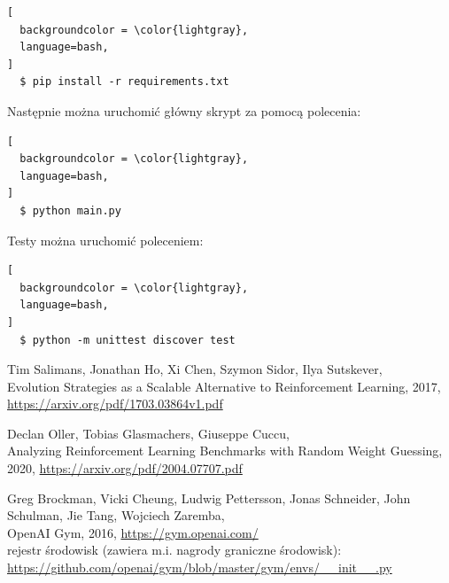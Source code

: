 \documentclass[12pt,a4paper]{article}
\begin{document}
\begin{lstlisting}[
  backgroundcolor = \color{lightgray},
  language=bash,
]
  $ pip install -r requirements.txt
\end{lstlisting}

\bigskip

Następnie można uruchomić główny skrypt za pomocą polecenia:

\begin{lstlisting}[
  backgroundcolor = \color{lightgray},
  language=bash,
]
  $ python main.py
\end{lstlisting}

Testy można uruchomić poleceniem:

\begin{lstlisting}[
  backgroundcolor = \color{lightgray},
  language=bash,
]
  $ python -m unittest discover test
\end{lstlisting}


\pagebreak
\begin{thebibliography}{9}
  Tim Salimans, Jonathan Ho, Xi Chen, Szymon Sidor, Ilya Sutskever,\\
  Evolution Strategies as a Scalable Alternative to Reinforcement Learning,
  2017, \href{https://arxiv.org/pdf/1703.03864v1.pdf}{https://arxiv.org/pdf/1703.03864v1.pdf}

  Declan Oller, Tobias Glasmachers, Giuseppe Cuccu, \\
  Analyzing Reinforcement Learning Benchmarks with Random Weight Guessing,
  2020, \href{https://arxiv.org/pdf/2004.07707.pdf}{https://arxiv.org/pdf/2004.07707.pdf}

  Greg Brockman, Vicki Cheung, Ludwig Pettersson, Jonas Schneider, John Schulman, Jie Tang, Wojciech Zaremba,\\
  OpenAI Gym, 2016, \href{https://gym.openai.com/}{https://gym.openai.com/} \\
  rejestr środowisk (zawiera m.i. nagrody graniczne środowisk): \\
  \href{https://github.com/openai/gym/blob/master/gym/envs/\_\_init\_\_.py}{https://github.com/openai/gym/blob/master/gym/envs/\_\_init\_\_.py}

\end{thebibliography}
\end{document}
